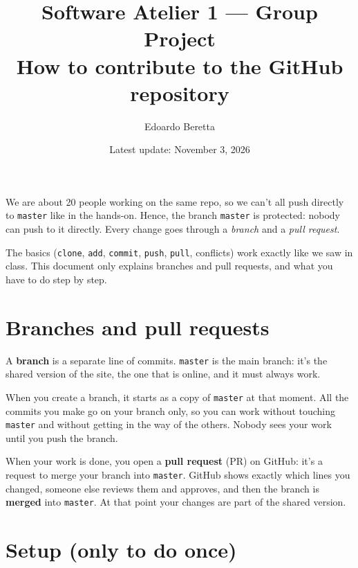 \documentclass[11pt, a4paper]{article}
\title{Software Atelier 1 --- Group Project\\[0.3em] \large{How to contribute to the GitHub repository}}
\author{Edoardo Beretta}
\date{Latest update: November 3, 2026}
\begin{document}
\maketitle

We are about 20 people working on the same repo, so we can't all push directly to \texttt{master} like in the hands-on. Hence, the branch \texttt{master} is protected: nobody can push to it directly. Every change goes through a \emph{branch} and a \emph{pull request}.

\vspace{0.8em}

The basics (\texttt{clone}, \texttt{add}, \texttt{commit}, \texttt{push}, \texttt{pull}, conflicts) work exactly like we saw in class. This document only explains branches and pull requests, and what you have to do step by step.

\section{Branches and pull requests}

A \textbf{branch} is a separate line of commits. \texttt{master} is the main branch: it's the shared version of the site, the one that is online, and it must always work.

\vspace{0.6em}

When you create a branch, it starts as a copy of \texttt{master} at that moment. All the commits you make go on your branch only, so you can work without touching \texttt{master} and without getting in the way of the others. Nobody sees your work until you push the branch.

\vspace{0.6em}

When your work is done, you open a \textbf{pull request} (PR) on GitHub: it's a request to merge your branch into \texttt{master}. GitHub shows exactly which lines you changed, someone else reviews them and approves, and then the branch is \textbf{merged} into \texttt{master}. At that point your changes are part of the shared version.

\section{Setup (only to do once)}
\end{document}

